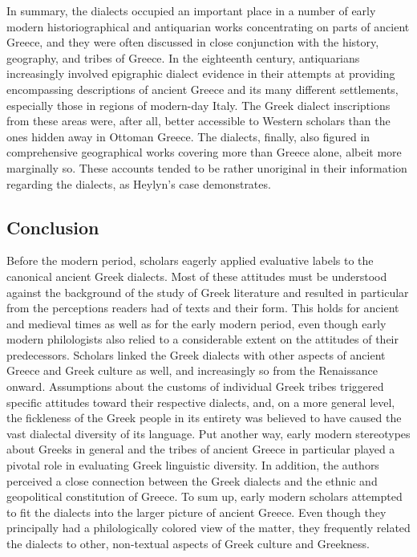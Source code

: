 \begin{styleStandard}
In summary, the dialects occupied an important place in a number of early modern historiographical and antiquarian works concentrating on parts of ancient Greece, and they were often discussed in close conjunction with the history, geography, and tribes of Greece. In the eighteenth century, antiquarians increasingly involved epigraphic dialect evidence in their attempts at providing encompassing descriptions of ancient Greece and its many different settlements, especially those in regions of modern-day Italy. The Greek dialect inscriptions from these areas were, after all, better accessible to Western scholars than the ones hidden away in Ottoman Greece. The dialects, finally, also figured in comprehensive geographical works covering more than Greece alone, albeit more marginally so. These accounts tended to be rather unoriginal in their information regarding the dialects, as Heylyn’s case demonstrates.
\end{styleStandard}

\subsection{Conclusion}
\hypertarget{Toc19704856}{}\begin{styleStandard}
Before the modern period, scholars eagerly applied evaluative labels to the canonical ancient Greek dialects. Most of these attitudes must be understood against the background of the study of Greek literature and resulted in particular from the perceptions readers had of texts and their form. This holds for ancient and medieval times as well as for the early modern period, even though early modern philologists also relied to a considerable extent on the attitudes of their predecessors. Scholars linked the Greek dialects with other aspects of ancient Greece and Greek culture as well, and increasingly so from the Renaissance onward. Assumptions about the customs of individual Greek tribes triggered specific attitudes toward their respective dialects, and, on a more general level, the fickleness of the Greek people in its entirety was believed to have caused the vast dialectal diversity of its language. Put another way, early modern stereotypes about Greeks in general and the tribes of ancient Greece in particular played a pivotal role in evaluating Greek linguistic diversity. In addition, the authors perceived a close connection between the Greek dialects and the ethnic and geopolitical constitution of Greece. To sum up, early modern scholars attempted to fit the dialects into the larger picture of ancient Greece. Even though they principally had a philologically colored view of the matter, they frequently related the dialects to other, non-textual aspects of Greek culture and Greekness.
\end{styleStandard}

